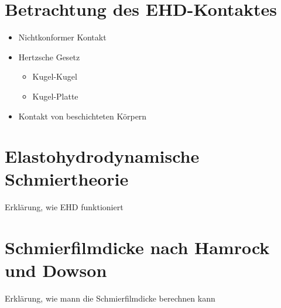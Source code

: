 
\section{Betrachtung des EHD-Kontaktes}
\label{sec:betrachtung_des_ehd_kontaktes}

\begin{itemize}
    \item Nichtkonformer Kontakt
    \item Hertzsche Gesetz
        \begin{itemize}
            \item Kugel-Kugel
            \item Kugel-Platte
        \end{itemize}
    \item Kontakt von beschichteten Körpern
\end{itemize}

\section{Elastohydrodynamische Schmiertheorie}
\label{elastohydrodynamische_schmiertheorie}

Erklärung, wie EHD funktioniert

\section{Schmierfilmdicke nach Hamrock und Dowson}
\label{sec:schmierfilmdicke_nach_hamrock_und_dowson}
Erklärung, wie mann die Schmierfilmdicke berechnen kann

